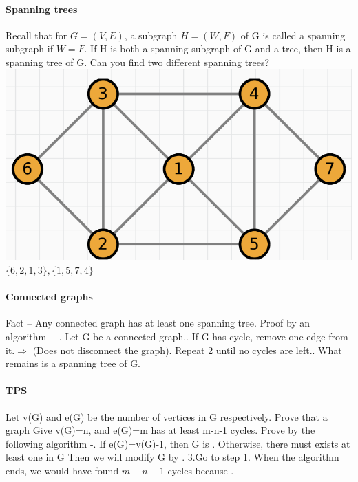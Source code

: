 \documentclass{article}
\begin{document}
\paragraph{Spanning trees}
Recall that for $G=(V,E)$, a subgraph $H=(W,F)$ of G is called
a spanning subgraph if $W=F.$\newline
If H is both a spanning subgraph of G and a tree, then H is a spanning tree of G.\newline
Can you find two different spanning trees?\newline
\includegraphics{0057}\newline
$\{6,2,1,3 \},\{1,5,7,4 \}$\newline
\paragraph{Connected graphs}
Fact – Any connected graph has at least one spanning tree.\newline
Proof by an algorithm —. Let G be a connected graph.. If G has cycle, remove one edge from it.$\Longrightarrow$ (Does not disconnect the graph). Repeat 2 until no cycles are left.. What remains is a spanning tree of G.\newline
\paragraph{TPS}
Let v(G) and e(G) be the number of vertices in G respectively. Prove that a graph Give v(G)=n, and e(G)=m has at least m-n-1 cycles.\newline
Prove by the following algorithm -. If e(G)=v(G)-1, then G is . Otherwise, there must exists at least one in G\newline
Then we will modify G by .\newline
3.Go to step 1.\newline
When the algorithm ends, we would have found $m-n-1$ cycles because .
\end{document}
